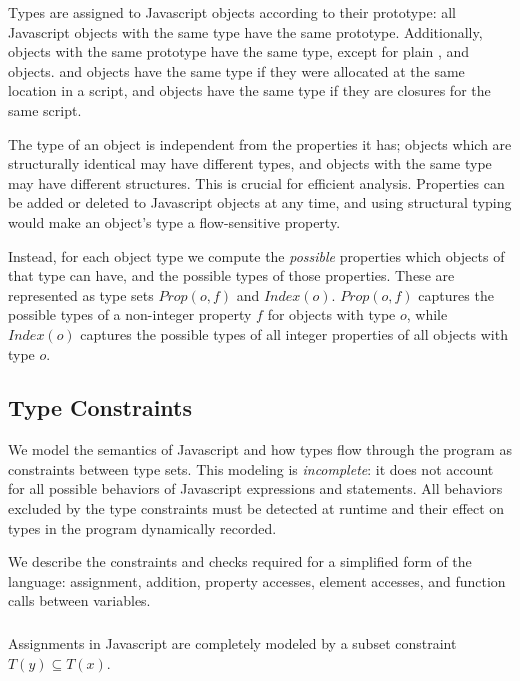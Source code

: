 Types are assigned to Javascript objects according to their prototype:
all Javascript objects with the same type have the same prototype.
Additionally, objects with the same prototype have the same type,
except for plain ,  and  objects.
 and  objects have the same type if they were
allocated at the same location in a script,
and  objects have the same type if they are closures
for the same script.

The type of an object is independent from the properties it has;
objects which are structurally identical may have different types,
and objects with the same type may have different structures.
This is crucial for efficient analysis.
Properties can be added or deleted to Javascript objects at any time,
and using structural typing would make an object's type a
flow-sensitive property.

Instead, for each object type we compute the {\it possible} properties
which objects of that type can have, and the possible types of those
properties.
These are represented as type sets $Prop(o,f)$ and $Index(o)$.
$Prop(o,f)$ captures the possible types of a non-integer property
$f$ for objects with type $o$, while $Index(o)$ captures the possible
types of all integer properties of all objects with type $o$.

\subsection{Type Constraints}

We model the semantics of Javascript and how types flow through the
program as constraints between type sets.
This modeling is {\it incomplete}: it does not account for all possible
behaviors of Javascript expressions and statements.
All behaviors excluded by the type constraints must be detected at runtime
and their effect on types in the program dynamically recorded.

We describe the constraints and checks required for a simplified form
of the language: assignment, addition, property accesses, element accesses,
and function calls between variables.

\subsubsection{}

Assignments in Javascript are completely modeled by a subset constraint
$T(y) \subseteq T(x)$.


